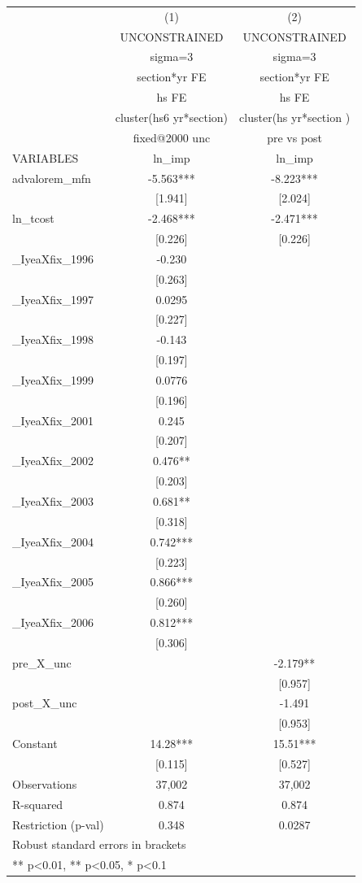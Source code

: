 \begin{tabular}{lcc}
\toprule
 & (1) & (2) \\
 & UNCONSTRAINED & UNCONSTRAINED \\
 & sigma=3 & sigma=3 \\
 & section*yr FE & section*yr FE \\
 & hs FE & hs FE \\
 & cluster(hs6 yr*section) & cluster(hs yr*section ) \\
 & fixed@2000 unc & pre vs post \\
VARIABLES & ln\_imp & ln\_imp \\
\midrule
advalorem\_mfn & -5.563*** & -8.223*** \\
 & [1.941] & [2.024] \\
ln\_tcost & -2.468*** & -2.471*** \\
 & [0.226] & [0.226] \\
\_IyeaXfix\_1996 & -0.230 &  \\
 & [0.263] &  \\
\_IyeaXfix\_1997 & 0.0295 &  \\
 & [0.227] &  \\
\_IyeaXfix\_1998 & -0.143 &  \\
 & [0.197] &  \\
\_IyeaXfix\_1999 & 0.0776 &  \\
 & [0.196] &  \\
\_IyeaXfix\_2001 & 0.245 &  \\
 & [0.207] &  \\
\_IyeaXfix\_2002 & 0.476** &  \\
 & [0.203] &  \\
\_IyeaXfix\_2003 & 0.681** &  \\
 & [0.318] &  \\
\_IyeaXfix\_2004 & 0.742*** &  \\
 & [0.223] &  \\
\_IyeaXfix\_2005 & 0.866*** &  \\
 & [0.260] &  \\
\_IyeaXfix\_2006 & 0.812*** &  \\
 & [0.306] &  \\
pre\_X\_unc &  & -2.179** \\
 &  & [0.957] \\
post\_X\_unc &  & -1.491 \\
 &  & [0.953] \\
Constant & 14.28*** & 15.51*** \\
 & [0.115] & [0.527] \\
\midrule
Observations & 37,002 & 37,002 \\
R-squared & 0.874 & 0.874 \\
Restriction (p-val) & 0.348 & 0.0287 \\
\bottomrule
\multicolumn{3}{l}{\footnotesize Robust standard errors in brackets} \\
\multicolumn{3}{l}{\footnotesize *** p<0.01, ** p<0.05, * p<0.1} \\
\end{tabular}
